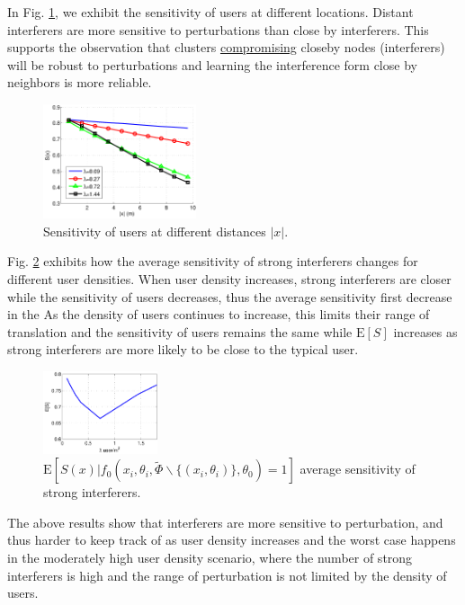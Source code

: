 \documentclass[10pt, conference, letterpaper]{IEEEtran}
\begin{document}
In Fig. \ref{fig:Channel_sensitivity}, we exhibit the sensitivity of users at different locations. Distant interferers are more sensitive to perturbations than close by interferers. This supports the observation that clusters \underline{compromising} closeby nodes (interferers) will be robust to perturbations and learning the interference form close by neighbors is more reliable. 

\begin{figure}
	\centering
	\includegraphics[width = 0.4\textwidth]{Channel_sensitivity.pdf}
	\caption{Sensitivity of users at different distances $|x|$.}
	\label{fig:Channel_sensitivity}
\end{figure}

Fig. \ref{fig:Channel_sensitivity_average} exhibits how the average sensitivity of strong interferers changes for different user densities. When user density increases, strong interferers are closer while the sensitivity of users decreases, thus the average sensitivity first decrease in the As the density of users continues to increase, this limits their range of translation and the sensitivity of users remains the same while $\mathrm{E}[S]$ increases as strong interferers are more likely to be close to the typical user. 

\begin{figure}
	\centering
	\includegraphics[width = 0.3\textwidth]{Channel_sensitivity_average.pdf}
	\caption{$\mathrm{E}[S(x)|f_0(x_i, \theta_i, \tilde{\Phi}\backslash\{(x_i,\theta_i)\}, \theta_0)=1]$ average sensitivity of strong interferers.}
	\label{fig:Channel_sensitivity_average}
\end{figure}

The above results show that interferers are more sensitive to perturbation, and thus harder to keep track of as user density increases and the worst case happens in the moderately high user density scenario, where the number of strong interferers is high and the range of perturbation is not limited by the density of users. 
\end{document}
